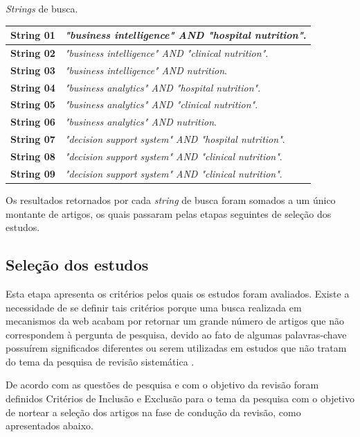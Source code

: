 \begin{quadro}[htb]
\caption{\label{quadro_stringsDeBusca}\textit{Strings} de busca.}
\label{}
\begin{tabular}{|p{2cm}|p{9cm}|}
	\hline
	\textbf{String 01}	& \textit{"business intelligence" AND "hospital nutrition"}.  \\ \hline
	\textbf{String 02}	& \textit{"business intelligence" AND "clinical nutrition"}.   \\ \hline
	\textbf{String 03}	& \textit{"business intelligence" AND nutrition}.   \\ \hline
	\textbf{String 04}	& \textit{"business analytics" AND "hospital nutrition"}.	\\ \hline
	\textbf{String 05}	& \textit{"business analytics" AND "clinical nutrition"}. \\ \hline
	\textbf{String 06}	& \textit{"business analytics" AND nutrition}. \\ \hline
	\textbf{String 07}	& \textit{"decision support system" AND "hospital nutrition"}.\\ \hline
    \textbf{String 08}	& \textit{"decision support system" AND "clinical nutrition"}.\\ \hline
    \textbf{String 09}	& \textit{"decision support system" AND "clinical nutrition"}.\\ \hline
\end{tabular}
\end{quadro}

Os resultados retornados por cada \textit{string} de busca foram somados a um único montante de artigos, os quais passaram pelas etapas seguintes de seleção dos estudos. 

\subsection{Seleção dos estudos}
Esta etapa apresenta os critérios pelos quais os estudos foram avaliados. Existe a necessidade de se definir tais critérios porque uma busca realizada em mecanismos da web acabam por retornar um grande número de artigos que não correspondem à pergunta de pesquisa, devido ao fato de algumas palavras-chave possuírem significados diferentes ou serem utilizadas em estudos que não tratam do tema da pesquisa de revisão sistemática \cite{biolchini2005, kitchenham2004}.

De acordo com as questões de pesquisa e com o objetivo da revisão foram definidos
Critérios de Inclusão e Exclusão para o tema da pesquisa com o objetivo de nortear a seleção dos artigos na fase de condução da revisão, como apresentados abaixo.

